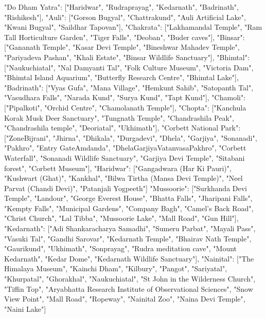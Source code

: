 {
  "Do Dham Yatra": ["Haridwar", "Rudraprayag", "Kedarnath", "Badrinath", "Rishikesh"],
  "Auli": ["Gorson Bugyal", "Chattrakund", "Auli Artificial Lake", "Kwani Bugyal", "Saildhar Tapovan"],
  "Chakrata": ["Lakhamandal Temple", "Ram Tall Horticulture Garden", "Tiger Falls", "Deoban", "Buder caves"],
  "Binsar": ["Gananath Temple", "Kasar Devi Temple", "Bineshwar Mahadev Temple", "Pariyadeva Pashan", "Khali Estate", "Binsar Wildlife Sanctuary"],
  "Bhimtal": ["Naukuchiatal", "Nal Damyanti Tal", "Folk Culture Museum", "Victoria Dam", "Bhimtal Island Aquarium", "Butterfly Research Centre", "Bhimtal Lake"],
  "Badrinath": ["Vyas Gufa", "Mana Village", "Hemkunt Sahib", "Satopanth Tal", "Vasudhara Falls", "Narada Kund", "Surya Kund", "Tapt Kund"],
  "Chamoli": ["Pipalkoti", "Orchid Centre", "Chamolanath Temple"],
  "Chopta": ["Kanchula Korak Musk Deer Sanctuary", "Tungnath Temple", "Chandrashila Peak", "Chandrashila temple", "Deoriatal", "Ukhimath"],
  "Corbett National Park": ["ZoneBijrani", "Jhirna", "Dhikala", "Durgadevi", "Dhela", "Garjiya", "Sonanadi", "Pakhro", "Entry GateAmdanda", "DhelaGarjiyaVatanvasaPakhro", "Corbett Waterfall", "Sonanadi Wildlife Sanctuary", "Garjiya Devi Temple", "Sitabani forest", "Corbett Museum"],
  "Haridwar": ["Gangadwara (Har Ki Pauri)", "Kushwart (Ghat)", "Kankhal", "Bilwa Tirtha (Mansa Devi Temple)", "Neel Parvat (Chandi Devi)", "Patanjali Yogpeeth"]
  "Mussoorie": ["Surkhanda Devi Temple", "Landour", "George Everest House", "Bhatta Falls", "Jharipani Falls", "Kempty Falls", "Municipal Gardens", "Company Bagh", "Camel's Back Road", "Christ Church", "Lal Tibba", "Mussoorie Lake", "Mall Road", "Gun Hill"],
  "Kedarnath": ["Adi Shankaracharya Samadhi", "Sumeru Parbat", "Mayali Pass", "Vasuki Tal", "Gandhi Sarovar", "Kedarnath Temple", "Bhairav Nath Temple", "Gaurikund", "Ukhimath", "Sonprayag", "Rudra meditation cave", "Mount Kedarnath", "Kedar Dome", "Kedarnath Wildlife Sanctuary"],
  "Nainital": ["The Himalaya Museum", "Kainchi Dham", "Kilbury", "Pangot", "Sariyatal", "Khurpatal", "Ghorakhal", "Naukuchiatal", "St John in the Wilderness Church", "Tiffin Top", "Aryabhatta Research Institute of Observational Sciences", "Snow View Point", "Mall Road", "Ropeway", "Nainital Zoo", "Naina Devi Temple", "Naini Lake"]
}

